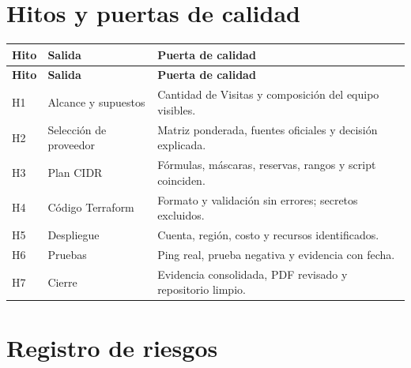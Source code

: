 \section{Hitos y puertas de calidad}

\begin{longtable}{p{2.2cm}p{4.1cm}p{7.1cm}}
\toprule
\textbf{Hito} & \textbf{Salida} & \textbf{Puerta de calidad} \\
\midrule
\endfirsthead
\toprule
\textbf{Hito} & \textbf{Salida} & \textbf{Puerta de calidad} \\
\midrule
\endhead
H1 & Alcance y supuestos & Cantidad de Visitas y composición del equipo visibles. \\
H2 & Selección de proveedor & Matriz ponderada, fuentes oficiales y decisión explicada. \\
H3 & Plan CIDR & Fórmulas, máscaras, reservas, rangos y script coinciden. \\
H4 & Código Terraform & Formato y validación sin errores; secretos excluidos. \\
H5 & Despliegue & Cuenta, región, costo y recursos identificados. \\
H6 & Pruebas & Ping real, prueba negativa y evidencia con fecha. \\
H7 & Cierre & Evidencia consolidada, PDF revisado y repositorio limpio. \\
\bottomrule
\end{longtable}

\section{Registro de riesgos}

